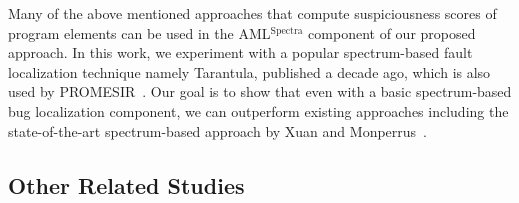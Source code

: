 


Many of the above mentioned approaches that compute suspiciousness scores of program elements can be used in the AML$^\text{Spectra}$ component of our proposed approach. In this work, we experiment with a popular spectrum-based fault localization technique namely Tarantula, published a decade ago, which is also used by PROMESIR~\cite{PoshyvanykGMAR07}. Our goal is to show that even with a basic spectrum-based bug localization component, we can outperform existing approaches including the state-of-the-art spectrum-based approach by Xuan and Monperrus~\cite{XuanM14}.



\subsection{Other Related Studies} 


